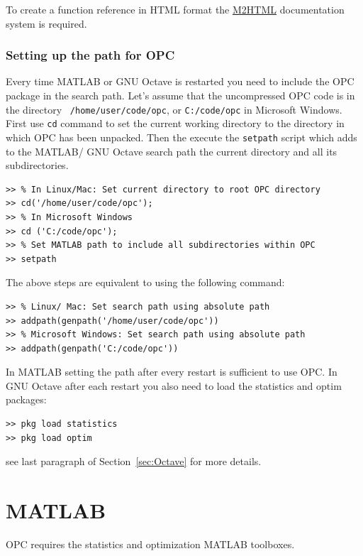 \documentclass{book}
\begin{document}
\noindent
%
To create a function reference in HTML format the
%
\href{https://www.artefact.tk/software/matlab/m2html/}{M2HTML}
%
documentation system is required.



\subsubsection{Setting up the path for OPC}\label{sec:path}

Every time MATLAB or GNU Octave is restarted you need to include the OPC
package in the search path.
%
Let's assume that the uncompressed OPC code is in the directory {\tt
/home/user/code/opc}, or {\tt C:/code/opc} in Microsoft Windows.  First use
{\tt cd} command to set the current working directory to the 
directory in which OPC has been unpacked.
%
Then the execute the {\tt setpath} script which adds to the MATLAB/ GNU Octave search
path the current directory and all its subdirectories.

\begin{verbatim}
>> % In Linux/Mac: Set current directory to root OPC directory
>> cd('/home/user/code/opc');
>> % In Microsoft Windows
>> cd ('C:/code/opc');
>> % Set MATLAB path to include all subdirectories within OPC
>> setpath
\end{verbatim}

\noindent
%
The above steps are equivalent to using the following command:

\begin{verbatim}
>> % Linux/ Mac: Set search path using absolute path
>> addpath(genpath('/home/user/code/opc'))
>> % Microsoft Windows: Set search path using absolute path
>> addpath(genpath('C:/code/opc'))
\end{verbatim}

In MATLAB setting the path after every restart is sufficient to use OPC.
In GNU Octave after each restart you also need to load the statistics and optim
packages: 

\begin{verbatim}
>> pkg load statistics 
>> pkg load optim
\end{verbatim}
%
see last paragraph of Section~\ref{sec:Octave} for more details. 


\section{MATLAB}

OPC requires the statistics and optimization MATLAB toolboxes. 
\end{document}
